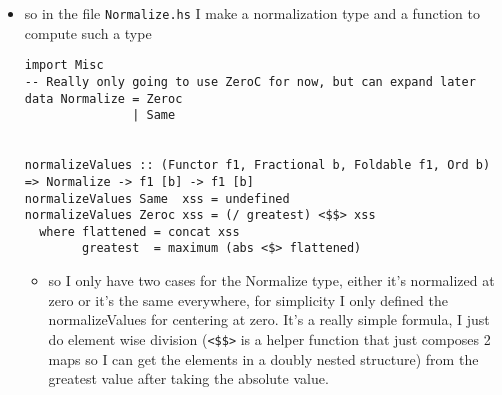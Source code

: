 \documentclass{article}
\begin{document}
\begin{itemize}
\begin{itemize}
\item so in the file \texttt{Normalize.hs} Ι make a normalization type and a
function to compute such a type
\begin{verbatim}
import Misc
-- Really only going to use ZeroC for now, but can expand later
data Normalize = Zeroc
               | Same


normalizeValues :: (Functor f1, Fractional b, Foldable f1, Ord b) => Normalize -> f1 [b] -> f1 [b]
normalizeValues Same  xss = undefined
normalizeValues Zeroc xss = (/ greatest) <$$> xss
  where flattened = concat xss
        greatest  = maximum (abs <$> flattened)
\end{verbatim}
\begin{itemize}
\item so I only have two cases for the Normalize type, either it's
normalized at zero or it's the same everywhere, for simplicity
Ι only defined the normalizeValues for centering at zero. It's
a really simple formula, I just do element wise division (\texttt{<\$\$>}
is a helper function that just composes 2 maps so I can get the
elements in a doubly nested structure) from the greatest value
after taking the absolute value.


\end{itemize}
\end{itemize}
\end{itemize}
\end{document}
